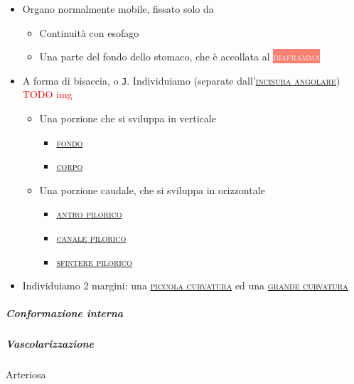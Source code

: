 \documentclass[italian,]{article}
\providecommand{\tightlist}{%
  \setlength{\itemsep}{0pt}\setlength{\parskip}{0pt}}
\newcommand{\mus}[1]{\colorbox{Salmon}{\textcolor{white}{\textsc{#1}}}}
\renewcommand{\a}[1]{\underline{\textsc{#1}}}
\newcommand{\TODO}[1]{\textcolor{red}{\textsf{\footnotesize{TODO #1}}}} %
\begin{document}
\begin{itemize}
\tightlist
\item
  Organo normalmente mobile, fissato solo da

  \begin{itemize}
  \tightlist
  \item
    Continuità con esofago
  \item
    Una parte del fondo dello stomaco, che è accollata al
    \mus{diaframma}
  \end{itemize}
\item
  A forma di bisaccia, o \texttt{J}. Individuiamo (separate
  dall'\a{incisura angolare}) \TODO{img}

  \begin{itemize}
  \tightlist
  \item
    Una porzione che si sviluppa in verticale

    \begin{itemize}
    \tightlist
    \item
      \a{fondo}~
    \item
      \a{corpo}~
    \end{itemize}
  \item
    Una porzione caudale, che si sviluppa in orizzontale

    \begin{itemize}
    \tightlist
    \item
      \a{antro pilorico}~
    \item
      \a{canale pilorico}~
    \item
      \a{sfintere pilorico}~
    \end{itemize}
  \end{itemize}
\item
  Individuiamo 2 margini: una \a{piccola curvatura} ed una
  \a{grande curvatura}
\end{itemize}

\hypertarget{conformazione-interna}{%
\subparagraph{Conformazione interna}\label{conformazione-interna}}

\hypertarget{vascolarizzazione-4}{%
\subparagraph{Vascolarizzazione}\label{vascolarizzazione-4}}

Arteriosa
\end{document}
